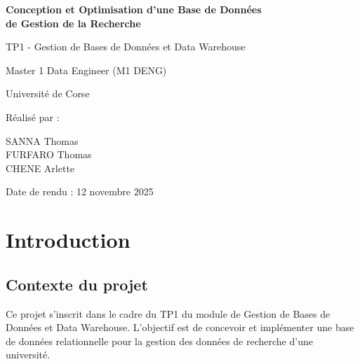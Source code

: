 \documentclass[12pt,a4paper]{article}
\begin{document}
\begin{titlepage}
    \centering
    \vspace*{2cm}
    
    {\Huge\bfseries Conception et Optimisation d'une Base de Données\\de Gestion de la Recherche\par}
    
    \vspace{1.5cm}
    
    {\Large TP1 - Gestion de Bases de Données et Data Warehouse\par}
    
    \vspace{2cm}
    
    {\large Master 1 Data Engineer (M1 DENG)\par}
    
    \vspace{1cm}
    
    {\large Université de Corse\par}
    
    \vspace{3cm}
    
    {\large Réalisé par :\par}
    {\Large 
    SANNA Thomas\\
    FURFARO Thomas\\
    CHENE Arlette\par}
    
    \vfill
    
    {\large Date de rendu : 12 novembre 2025\par}
    
\end{titlepage}

\tableofcontents
\newpage

\section{Introduction}

\subsection{Contexte du projet}
Ce projet s'inscrit dans le cadre du TP1 du module de Gestion de Bases de Données et Data Warehouse. L'objectif est de concevoir et implémenter une base de données relationnelle pour la gestion des données de recherche d'une université.
\end{document}
